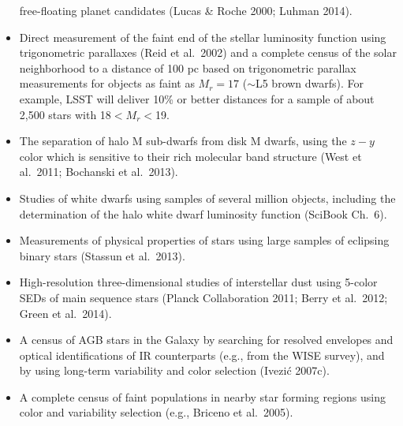 \begin{itemize}
          free-floating planet candidates (Lucas \& Roche 2000; Luhman 2014).
\item Direct measurement of the faint end of the stellar luminosity function
          using trigonometric parallaxes (Reid et al.~2002) and a complete census of the
          solar neighborhood to a distance of 100 pc based on trigonometric parallax measurements for objects as faint as
          $M_r=17$ ($\sim$L5 brown dwarfs). For example, LSST will deliver 10\% or better distances for a sample of about 2,500 stars
          with 18$<M_r<$19. %
\item The separation of halo M sub-dwarfs from disk M dwarfs, using the $z-y$ color which is sensitive to their rich molecular band
          structure (West et al.~2011; Bochanski et al.~2013).
\item Studies of white dwarfs using samples of several million objects, including the determination of the halo white dwarf luminosity
          function (SciBook Ch.~6).
\item Measurements of physical properties of stars using large samples of eclipsing binary stars (Stassun et al.~2013).
\item High-resolution three-dimensional studies of interstellar dust using 5-color
          SEDs of main sequence stars (Planck Collaboration 2011; Berry et al.~2012; Green et al.~2014).
\item A census of AGB stars in the Galaxy by searching for resolved envelopes and optical  identifications of IR counterparts
         (e.g., from the WISE survey), and by using long-term variability and color selection (Ivezi\'{c} 2007c).
\item A complete census of faint populations in nearby star forming regions using
          color and variability selection (e.g., Briceno et al.~2005).
\end{itemize}


